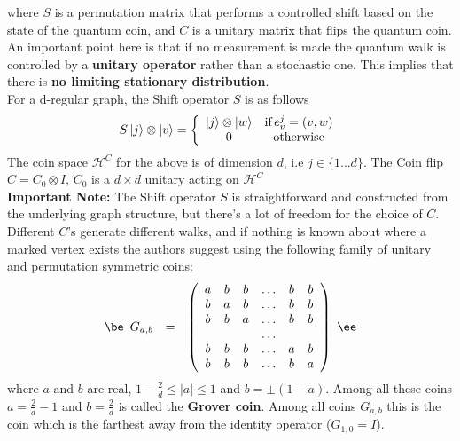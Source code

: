 \documentclass{article}
\newcommand{\Hi}{\mathcal{H}}
\begin{document}
where $S$ is a permutation matrix that performs a controlled shift based on the state of the quantum coin, and $C$ is a unitary matrix that flips the quantum coin.
An important point here is that if no measurement is made the quantum walk is controlled by a \textbf{unitary operator} rather than a stochastic
one. This implies that there is \textbf{no limiting stationary distribution}. \\

For a d-regular graph, the Shift operator $S$ is as follows
\begin{equation}
    S \ket{j} \otimes \ket{v} =\left\{ \begin{array}{cc} \ket{j} \otimes \ket{w} & \mbox{if}\, e_v^j=(v,w) \\
0 & \mbox{otherwise} \end{array}\right.
\end{equation}
The coin space $\Hi^C$ for the above is of dimension $d$, i.e $j \in \{1 \ldots d\}$. The Coin flip $C = C_0 \otimes I$, $C_0$ is a $d\times d$ unitary acting on $\Hi^C$\\
\textbf{Important Note:} The Shift operator $S$ is straightforward and constructed from the underlying graph structure, but there's a lot of freedom for the choice of $C$. Different $C$'s generate different walks, and if nothing is known about where a marked vertex exists the authors suggest using the following family of unitary and permutation symmetric coins: 
\begin{equation}
\be
\begin{array}{lcc} \label{Eq:grover}
G_{a,b}&=&\left( \begin{array}{cccccc}
a&b&b&\ldots &b&b\\
b&a&b& \ldots &b&b\\
b&b&a&\ldots &b&b\\
 &&& \ldots &\\
b&b&b&\ldots & a&b\\
b&b&b&\ldots &b& a \end{array} \right)
\end{array}
\ee
\end{equation}
where $a$ and $b$ are real, $1-\frac{2}{d} \leq |a| \leq 1$ and $b=\pm (1-a)$. Among all these coins $a=\frac{2}{d}-1$ and $b=\frac{2}{d}$ is called the \textbf{Grover coin}. Among all coins $G_{a,b}$ this is the coin which is the farthest away from the identity operator ($G_{1,0}=I$).
\end{document}
